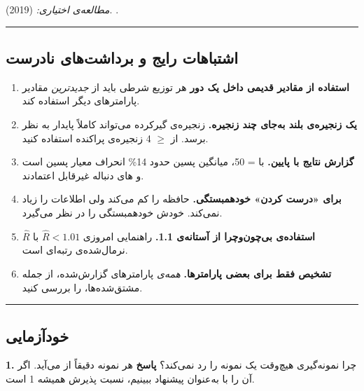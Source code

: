 \emph{مطالعه‌ی اختیاری:}  \lr{\&}  (2019).  \emph{}.

\begin{center}\rule{0.5\linewidth}{0.5pt}\end{center}

\subsection{اشتباهات رایج و برداشت‌های نادرست}

\begin{enumerate}
\def\labelenumi{\arabic{enumi}.}
\tightlist
\item
  \textbf{استفاده از مقادیر قدیمی داخل یک دور } هر توزیع شرطی
  باید از \emph{جدیدترین} مقادیر پارامترهای دیگر استفاده کند.
\item
  \textbf{یک زنجیره‌ی بلند به‌جای چند زنجیره.} زنجیره‌ی گیرکرده می‌تواند
  کاملاً پایدار به نظر برسد. از \ensuremath{\geq} 4 زنجیره‌ی پراکنده استفاده کنید.
\item
  \textbf{گزارش نتایج با  پایین.} با  = 50، 
  میانگین پسین حدود 14\% انحراف معیار پسین است و های دنباله
  غیرقابل اعتمادند.
\item
  \textbf{ برای «درست کردن» خودهمبستگی.} 
  حافظه را کم می‌کند ولی اطلاعات را زیاد نمی‌کند.  خودش خودهمبستگی
  را در نظر می‌گیرد.
\item
  \textbf{استفاده‌ی بی‌چون‌وچرا از آستانه‌ی 1.1.} راهنمایی امروزی
  \(\hat R < 1.01\) با \(\hat R\) نرمال‌شده‌ی رتبه‌ای است.
\item
  \textbf{تشخیص فقط برای بعضی پارامترها.} \emph{همه‌ی} پارامترهای
  گزارش‌شده، از جمله مشتق‌شده‌ها، را بررسی کنید.
\end{enumerate}

\begin{center}\rule{0.5\linewidth}{0.5pt}\end{center}

\subsection{خودآزمایی}

\textbf{1.} چرا نمونه‌گیری  هیچ‌وقت یک نمونه را رد نمی‌کند؟
\textbf{پاسخ} هر نمونه دقیقاً از  می‌آید. اگر آن را
 با  به‌عنوان پیشنهاد
ببینیم، نسبت پذیرش همیشه 1 است.

